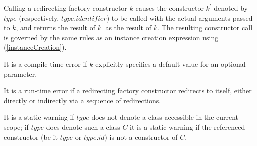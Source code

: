 \documentclass{article}
\begin{document}
\LMHash{}
Calling a redirecting factory constructor $k$ causes the constructor $k^\prime$ denoted by $type$ (respectively, $type.identifier$) to be called with the actual arguments passed to $k$, and returns the result of $k^\prime$ as the result of $k$.  The resulting constructor call is governed by the same rules as an instance creation expression using \NEW{} (\ref{instanceCreation}). 


\LMHash{}
It is a compile-time error if $k$ explicitly specifies a default value for an optional parameter.

\LMHash{}
It is a run-time error if a redirecting factory constructor redirects to itself, either directly or indirectly via a sequence of redirections. %




\LMHash{}
It is a static warning if $type$ does not denote a class accessible in the current scope; if $type$ does denote such a class $C$ it is a static warning if the referenced constructor (be it $type$ or $type.id$) is not a constructor of $C$.
\end{document}
